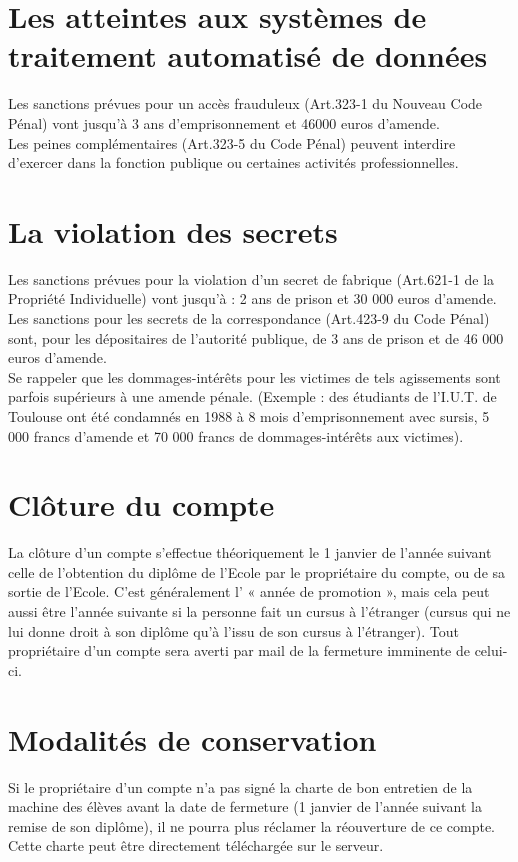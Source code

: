 \documentclass[10pt,a4paper]{article}
\begin{document}
\section{Les atteintes aux systèmes de traitement automatisé de données}
Les sanctions prévues pour un accès frauduleux (Art.323-1 du Nouveau Code Pénal) vont jusqu'à 3 ans d'emprisonnement et 46000 euros d'amende.\\
Les peines complémentaires (Art.323-5 du Code Pénal) peuvent interdire d'exercer dans la fonction publique ou certaines activités professionnelles.

\section{La violation des secrets}
Les sanctions prévues pour la violation d'un secret de fabrique (Art.621-1 de la Propriété Individuelle) vont jusqu'à : 2 ans de prison et 30 000 euros d'amende. Les sanctions pour les secrets de la correspondance (Art.423-9 du Code Pénal) sont, pour les dépositaires de l'autorité publique, de 3 ans de prison et de 46 000 euros d'amende.\\

Se rappeler que les dommages-intérêts pour les victimes de tels agissements sont parfois supérieurs à une amende pénale. (Exemple : des étudiants de l'I.U.T. de Toulouse ont été condamnés en 1988 à 8 mois d'emprisonnement avec sursis, 5 000 francs d'amende et 70 000 francs de dommages-intérêts aux victimes).

\section{Clôture du compte}
La clôture d'un compte s'effectue théoriquement le 1 janvier de l'année suivant celle de l'obtention du diplôme de l'Ecole par le
propriétaire du compte, ou de sa sortie de l'Ecole. C'est généralement l' « année de promotion », mais cela peut aussi être l'année suivante si la personne fait un cursus à l'étranger (cursus qui ne lui donne droit à son diplôme qu'à l'issu de son cursus à l'étranger). Tout propriétaire d'un compte sera averti par mail de la fermeture imminente de celui-ci.

\section{Modalités de conservation}
Si le propriétaire d'un compte n'a pas signé la charte de bon entretien de la machine des élèves avant la date de fermeture (1 janvier de l'année suivant la remise de son diplôme), il ne pourra plus réclamer la réouverture de ce compte. Cette charte peut être directement téléchargée sur le serveur.
\end{document}
